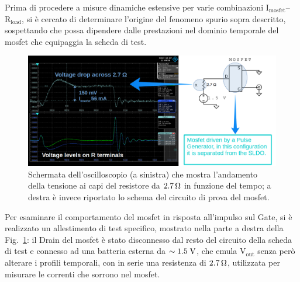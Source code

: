 Prima di procedere a misure dinamiche estensive per varie combinazioni $\mathrm{I_{mosfet}}$--$\mathrm{R_{load}}$, si è cercato di determinare l'origine del fenomeno spurio sopra descritto, sospettando che possa dipendere dalle prestazioni nel dominio temporale del mosfet che equipaggia la scheda di test.


\begin{figure}
\centering
\includegraphics[width=\linewidth]{Immagini/MosfetBehaviourbis}
\caption{Schermata dell'oscilloscopio (a sinistra) che mostra l'andamento della tensione ai capi del resistore da $2.7{\rm \, \Omega}$ in funzione del tempo; a destra è invece riportato lo schema del circuito di prova del mosfet.}
\label{MosfetBehaviour}
\end{figure}

Per esaminare il comportamento del mosfet in risposta all'impulso sul Gate, si è realizzato un allestimento di test specifico, mostrato nella parte a destra della Fig.~\ref{MosfetBehaviour}: il Drain del mosfet è stato disconnesso dal resto del circuito della scheda di test e connesso ad una batteria esterna da $\sim 1.5\rm \; V$, che emula $\mathrm{V_{out}}$ senza per\`o alterare i profili temporali, con in serie una resistenza di $2.7{\rm \, \Omega}$, utilizzata per misurare le correnti che sorrono nel mosfet. 

